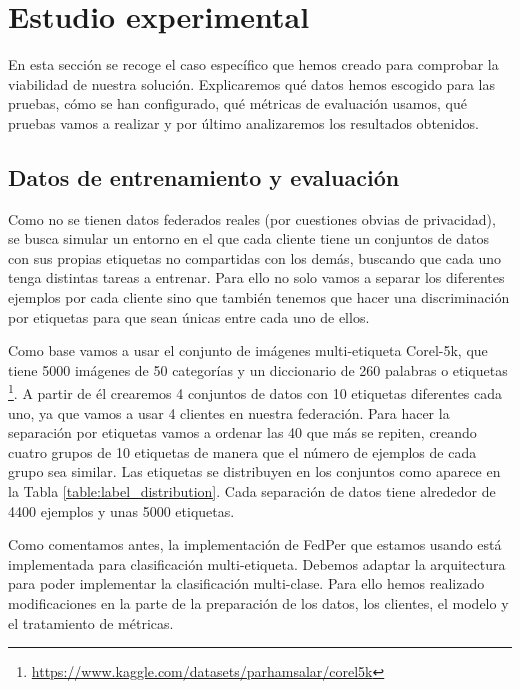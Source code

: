 \chapter{Estudio experimental} \label{cap4}

\vspace*{5mm}

En esta sección se recoge el caso específico que hemos creado para comprobar la viabilidad de nuestra solución. Explicaremos qué datos hemos escogido para las pruebas, cómo se han configurado, qué métricas de evaluación usamos, qué pruebas vamos a realizar y por último analizaremos los resultados obtenidos.

\section{Datos de entrenamiento y evaluación}

Como no se tienen datos federados reales (por cuestiones obvias de privacidad), se busca simular un entorno en el que cada cliente tiene un conjuntos de datos con sus propias etiquetas no compartidas con los demás, buscando que cada uno tenga distintas tareas a entrenar. Para ello no solo vamos a separar los diferentes ejemplos por cada cliente sino que también tenemos que hacer una discriminación por etiquetas para que sean únicas entre cada uno de ellos.

Como base vamos a usar el conjunto de imágenes multi-etiqueta Corel-5k, que tiene 5000 imágenes de 50 categorías y un diccionario de 260 palabras o etiquetas \footnote{\url{https://www.kaggle.com/datasets/parhamsalar/corel5k}}. A partir de él crearemos 4 conjuntos de datos con 10 etiquetas diferentes cada uno, ya que vamos a usar 4 clientes en nuestra federación. Para hacer la separación por etiquetas vamos a ordenar las 40 que más se repiten, creando cuatro grupos de 10 etiquetas de manera que el número de ejemplos de cada grupo sea similar. Las etiquetas se distribuyen en los conjuntos como aparece en la Tabla \ref{table:label_distribution}. Cada separación de datos tiene alrededor de 4400 ejemplos y unas 5000 etiquetas.

Como comentamos antes, la implementación de FedPer que estamos usando está implementada para clasificación multi-etiqueta. Debemos adaptar la arquitectura para poder implementar la clasificación multi-clase. Para ello hemos realizado modificaciones en la parte de la preparación de los datos, los clientes, el modelo y el tratamiento de métricas.

